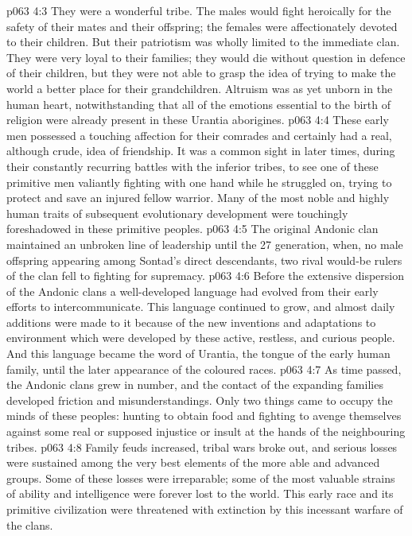 \vs p063 4:3 \pc They were a wonderful tribe. The males would fight heroically for the safety of their mates and their offspring; the females were affectionately devoted to their children. But their patriotism was wholly limited to the immediate clan. They were very loyal to their families; they would die without question in defence of their children, but they were not able to grasp the idea of trying to make the world a better place for their grandchildren. Altruism was as yet unborn in the human heart, notwithstanding that all of the emotions essential to the birth of religion were already present in these Urantia aborigines.
\vs p063 4:4 These early men possessed a touching affection for their comrades and certainly had a real, although crude, idea of friendship. It was a common sight in later times, during their constantly recurring battles with the inferior tribes, to see one of these primitive men valiantly fighting with one hand while he struggled on, trying to protect and save an injured fellow warrior. Many of the most noble and highly human traits of subsequent evolutionary development were touchingly foreshadowed in these primitive peoples.
\vs p063 4:5 \pc The original Andonic clan maintained an unbroken line of leadership until the 27 generation, when, no male offspring appearing among Sontad’s direct descendants, two rival would\hyp{}be rulers of the clan fell to fighting for supremacy.
\vs p063 4:6 Before the extensive dispersion of the Andonic clans a well\hyp{}developed language had evolved from their early efforts to intercommunicate. This language continued to grow, and almost daily additions were made to it because of the new inventions and adaptations to environment which were developed by these active, restless, and curious people. And this language became the word of Urantia, the tongue of the early human family, until the later appearance of the coloured races.
\vs p063 4:7 \pc As time passed, the Andonic clans grew in number, and the contact of the expanding families developed friction and misunderstandings. Only two things came to occupy the minds of these peoples: hunting to obtain food and fighting to avenge themselves against some real or supposed injustice or insult at the hands of the neighbouring tribes.
\vs p063 4:8 Family feuds increased, tribal wars broke out, and serious losses were sustained among the very best elements of the more able and advanced groups. Some of these losses were irreparable; some of the most valuable strains of ability and intelligence were forever lost to the world. This early race and its primitive civilization were threatened with extinction by this incessant warfare of the clans.
